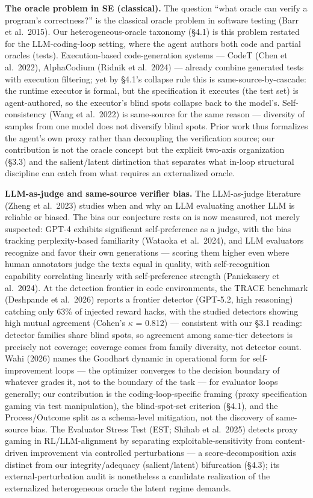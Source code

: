 \documentclass[
  11pt,
]{article}
\begin{document}
\textbf{The oracle problem in SE (classical).} The question ``what
oracle can verify a program's correctness?'' is the classical oracle
problem in software testing (Barr et al.~2015). Our heterogeneous-oracle
taxonomy (§4.1) is this problem restated for the LLM-coding-loop
setting, where the agent authors both code and partial oracles (tests).
Execution-based code-generation systems --- CodeT (Chen et al.~2022),
AlphaCodium (Ridnik et al.~2024) --- already combine generated tests
with execution filtering; yet by §4.1's collapse rule this is
same-source-by-cascade: the runtime executor is formal, but the
specification it executes (the test set) is agent-authored, so the
executor's blind spots collapse back to the model's. Self-consistency
(Wang et al.~2022) is same-source for the same reason --- diversity of
samples from one model does not diversify blind spots. Prior work thus
formalizes the agent's own proxy rather than decoupling the verification
source; our contribution is not the oracle concept but the explicit
two-axis organization (§3.3) and the salient/latent distinction that
separates what in-loop structural discipline can catch from what
requires an externalized oracle.

\textbf{LLM-as-judge and same-source verifier bias.} The LLM-as-judge
literature (Zheng et al.~2023) studies when and why an LLM evaluating
another LLM is reliable or biased. The bias our conjecture rests on is
now measured, not merely suspected: GPT-4 exhibits significant
self-preference as a judge, with the bias tracking perplexity-based
familiarity (Wataoka et al.~2024), and LLM evaluators recognize and
favor their own generations --- scoring them higher even where human
annotators judge the texts equal in quality, with self-recognition
capability correlating linearly with self-preference strength
(Panickssery et al.~2024). At the detection frontier in code
environments, the TRACE benchmark (Deshpande et al.~2026) reports a
frontier detector (GPT-5.2, high reasoning) catching only 63\% of
injected reward hacks, with the studied detectors showing high mutual
agreement (Cohen's $\kappa$ = 0.812) --- consistent with our §3.1 reading:
detector families share blind spots, so agreement among same-tier
detectors is precisely not coverage; coverage comes from family
diversity, not detector count. Wahi (2026) names the Goodhart dynamic in
operational form for self-improvement loops --- the optimizer converges
to the decision boundary of whatever grades it, not to the boundary of
the task --- for evaluator loops generally; our contribution is the
coding-loop-specific framing (proxy specification gaming via test
manipulation), the blind-spot-set criterion (§4.1), and the
Process/Outcome split as a schema-level mitigation, not the discovery of
same-source bias. The Evaluator Stress Test (EST; Shihab et al.~2025)
detects proxy gaming in RL/LLM-alignment by separating
exploitable-sensitivity from content-driven improvement via controlled
perturbations --- a score-decomposition axis distinct from our
integrity/adequacy (salient/latent) bifurcation (§4.3); its
external-perturbation audit is nonetheless a candidate realization of
the externalized heterogeneous oracle the latent regime demands.
\end{document}

